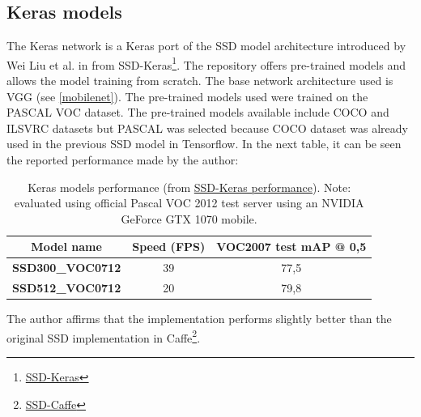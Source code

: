 \subsection{Keras models}
The Keras network is a Keras port of the SSD model architecture introduced by Wei Liu et al. in \cite{liu2016ssd} from SSD-Keras\footnote{\href{https://github.com/pierluigiferrari/ssd_keras}{SSD-Keras}}. The repository offers pre-trained models and allows the model training from scratch. The base network architecture used is VGG (see \ref{mobilenet}). The pre-trained models used were trained on the PASCAL VOC dataset. The pre-trained models available include COCO and ILSVRC datasets but PASCAL was selected because COCO dataset was already used in the previous SSD model in Tensorflow. In the next table, it can be seen the reported performance made by the author:
\begin{table}[H]
\begin{center}
\begin{tabular}{|c|c|c|}
\hline
Model name               & Speed (FPS) & VOC2007 test mAP @ 0,5 \\ \hline
\textbf{SSD300\_VOC0712} & 39          & 77,5                   \\ \hline
\textbf{SSD512\_VOC0712} & 20          & 79,8                   \\ \hline
\end{tabular}
\end{center}
\caption{Keras models performance (from \href{https://github.com/pierluigiferrari/ssd_keras#performance}{SSD-Keras performance}). Note: evaluated using official Pascal VOC 2012 test server using an NVIDIA GeForce GTX 1070 mobile.}
\end{table}
The author affirms that the implementation performs slightly better than the original SSD implementation in Caffe\footnote{\href{https://github.com/weiliu89/caffe/tree/ssd}{SSD-Caffe}}.

